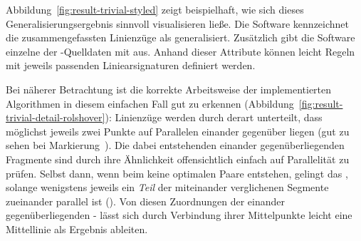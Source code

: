 \documentclass[../main/thesis.tex]{subfiles}
\begin{document}
Abbildung~\ref{fig:result-trivial-styled} zeigt beispielhaft, wie sich dieses Generalisierungsergebnis sinnvoll visualisieren ließe.
Die Software kennzeichnet die zusammengefassten Linienzüge als generalisiert.
Zusätzlich gibt die Software einzelne  der \osm-Quelldaten mit aus.
Anhand dieser Attribute können leicht Regeln mit jeweils passenden Liniearsignaturen definiert werden.


Bei näherer Betrachtung ist die korrekte Arbeitsweise der implementierten Algorithmen in diesem einfachen Fall gut zu erkennen (Abbildung~\ref{fig:result-trivial-detail-rolshover}):
Linienzüge werden durch  derart unterteilt, dass möglichst jeweils zwei Punkte auf Parallelen einander gegenüber liegen (gut zu sehen bei Markierung~).
Die dabei entstehenden einander gegenüberliegenden Fragmente sind durch ihre Ähnlichkeit offensichtlich einfach auf Parallelität zu prüfen.
Selbst dann, wenn beim  keine optimalen Paare entstehen, gelingt das , solange wenigstens jeweils ein \emph{Teil} der miteinander verglichenen Segmente zueinander parallel ist ().
Von diesen Zuordnungen der einander gegenüberliegenden \osm- lässt sich durch Verbindung ihrer Mittelpunkte leicht eine Mittellinie als Ergebnis ableiten.
\end{document}
